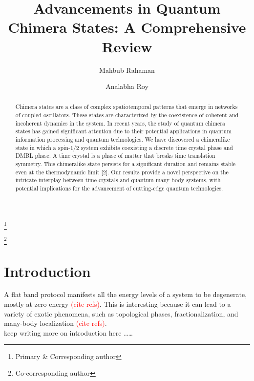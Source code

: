 \documentclass[%
reprint,
superscriptaddress,
amsmath,amssymb,
aps,
prb,
showkeys,
]{revtex4-2}
\newcommand{\red}[1]{\textcolor{red}{#1}}
\begin{document}

\title{Advancements in Quantum Chimera States: A Comprehensive Review}%

\author{Mahbub Rahaman}
\thanks{Primary \& Corresponding author}
\author{Analabha Roy}
\thanks{Co-corresponding author}


\begin{abstract}
Chimera states are a class of complex spatiotemporal patterns that emerge in networks of coupled oscillators. These states are characterized by the coexistence of coherent and incoherent dynamics in the system. In recent years, the study of quantum chimera states has gained significant attention due to their potential applications in quantum information processing and quantum technologies. We have discovered a chimeralike state in which a spin-1/2 system exhibits coexisting a discrete time crystal phase and DMBL phase. A time crystal is a phase of matter that breaks time translation symmetry. This chimeralike state persists for a significant duration and remains stable even at the thermodynamic limit [2]. Our results provide a novel perspective on the intricate interplay between time crystals and quantum many-body systems, with potential implications for the advancement of cutting-edge quantum technologies.
\end{abstract}

\maketitle

\section{Introduction}
A flat band protocol manifests all the energy levels of a system to be degenerate, mostly at zero energy \red{(cite refs)}. This is interesting because it can lead to a variety of exotic phenomena, such as topological phases, fractionalization, and many-body localization  \red{(cite refs)}.\\ 
\vskip 1cm
	keep writing more on introduction here \dots\dots
\end{document}
